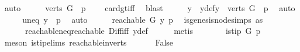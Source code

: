 \begin{isabellebody}
\ auto\isanewline
\ \ \isamarkupfalse%
\ \isamarkupfalse%
\ {\isachardoublequoteopen}{\isacharparenleft}{\kern0pt}{\isacharparenleft}{\kern0pt}verts\ G{\isacharparenright}{\kern0pt}\ {\isacharminus}{\kern0pt}\ {\isacharbraceleft}{\kern0pt}p{\isacharbraceright}{\kern0pt}{\isacharparenright}{\kern0pt}\ {\isasymnoteq}\ {\isacharbraceleft}{\kern0pt}{\isacharbraceright}{\kern0pt}{\isachardoublequoteclose}\ \isamarkupfalse%
\ card{\isacharunderscore}{\kern0pt}gt{\isacharunderscore}{\kern0pt}{}{\isacharunderscore}{\kern0pt}iff\ \isamarkupfalse%
\ blast\isanewline
\ \ \isamarkupfalse%
\ \isamarkupfalse%
\ y\ \ y{\isacharunderscore}{\kern0pt}def{\isacharcolon}{\kern0pt}{\isachardoublequoteopen}y\ {\isasymin}\ {\isacharparenleft}{\kern0pt}verts\ G{\isacharparenright}{\kern0pt}\ {\isacharminus}{\kern0pt}\ {\isacharbraceleft}{\kern0pt}p{\isacharbraceright}{\kern0pt}{\isachardoublequoteclose}\ \isamarkupfalse%
\ auto\isanewline
\ \ \isamarkupfalse%
\ \isamarkupfalse%
\ uneq{\isacharcolon}{\kern0pt}\ {\isachardoublequoteopen}y\ {\isasymnoteq}\ p{\isachardoublequoteclose}\ \isamarkupfalse%
\ auto\isanewline
\ \ \isamarkupfalse%
\ \isamarkupfalse%
\ {\isachardoublequoteopen}reachable{}\ G\ y\ p{\isachardoublequoteclose}\ \isamarkupfalse%
\ is{\isacharunderscore}{\kern0pt}genesis{\isacharunderscore}{\kern0pt}node{\isachardot}{\kern0pt}simps\ as\isanewline
\ \ \ \ \ \ reachable{\isacharunderscore}{\kern0pt}neq{\isacharunderscore}{\kern0pt}reachable{}\ Diff{\isacharunderscore}{\kern0pt}iff\ y{\isacharunderscore}{\kern0pt}def\isanewline
\ \ \ \ \isamarkupfalse%
\ metis\ \isanewline
\ \ \isamarkupfalse%
\ \isamarkupfalse%
\ {\isachardoublequoteopen}{\isasymnot}\ is{\isacharunderscore}{\kern0pt}tip\ G\ p{\isachardoublequoteclose}\isanewline
\ \ \ \ \isamarkupfalse%
\ {\isacharparenleft}{\kern0pt}meson\ is{\isacharunderscore}{\kern0pt}tip{\isachardot}{\kern0pt}elims{\isacharparenleft}{\kern0pt}{}{\isacharparenright}{\kern0pt}\ reachable{}{\isacharunderscore}{\kern0pt}in{\isacharunderscore}{\kern0pt}verts{\isacharparenleft}{\kern0pt}{}{\isacharparenright}{\kern0pt}{\isacharparenright}{\kern0pt}\ \isanewline
\ \ \isamarkupfalse%
\ \isamarkupfalse%
\ False\ \isamarkupfalse%

\end{isabellebody}
